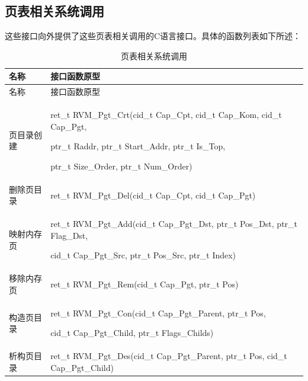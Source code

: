 \newpage
\subsection{页表相关系统调用}\label{subsec:3-5-3}

这些接口向外提供了这些页表相关调用的C语言接口。具体的函数列表如下所述：

\begin{xltabular}{\textwidth}{@{}>{\hsize\raggedright\arraybackslash}X>{\hsize\raggedright\arraybackslash}X@{}}
\caption{页表相关系统调用}\label{tab:3-7}\\
\toprule
名称 & 接口函数原型\tabularnewline
\endfirsthead
\toprule
名称 & 接口函数原型\tabularnewline
\midrule
\endhead
\bottomrule
\endlastfoot
页目录创建\strut
 & ret\_\allowbreak{}t RVM\_\allowbreak{}Pgt\_\allowbreak{}Crt(cid\_\allowbreak{}t Cap\_\allowbreak{}Cpt, cid\_\allowbreak{}t Cap\_\allowbreak{}Kom, cid\_\allowbreak{}t Cap\_\allowbreak{}Pgt,

ptr\_\allowbreak{}t Raddr, ptr\_\allowbreak{}t Start\_\allowbreak{}Addr, ptr\_\allowbreak{}t Is\_\allowbreak{}Top,

ptr\_\allowbreak{}t Size\_\allowbreak{}Order, ptr\_\allowbreak{}t Num\_\allowbreak{}Order)\strut
\tabularnewline
删除页目录 & ret\_\allowbreak{}t RVM\_\allowbreak{}Pgt\_\allowbreak{}Del(cid\_\allowbreak{}t Cap\_\allowbreak{}Cpt, cid\_\allowbreak{}t
Cap\_\allowbreak{}Pgt)\tabularnewline
映射内存页\strut
 & ret\_\allowbreak{}t RVM\_\allowbreak{}Pgt\_\allowbreak{}Add(cid\_\allowbreak{}t Cap\_\allowbreak{}Pgt\_\allowbreak{}Dst, ptr\_\allowbreak{}t Pos\_\allowbreak{}Dst, ptr\_\allowbreak{}t
Flag\_\allowbreak{}Dst,

cid\_\allowbreak{}t Cap\_\allowbreak{}Pgt\_\allowbreak{}Src, ptr\_\allowbreak{}t Pos\_\allowbreak{}Src, ptr\_\allowbreak{}t Index)\strut
\tabularnewline
移除内存页 & ret\_\allowbreak{}t RVM\_\allowbreak{}Pgt\_\allowbreak{}Rem(cid\_\allowbreak{}t Cap\_\allowbreak{}Pgt, ptr\_\allowbreak{}t
Pos)\tabularnewline
构造页目录\strut
 & ret\_\allowbreak{}t RVM\_\allowbreak{}Pgt\_\allowbreak{}Con(cid\_\allowbreak{}t Cap\_\allowbreak{}Pgt\_\allowbreak{}Parent, ptr\_\allowbreak{}t Pos,

cid\_\allowbreak{}t Cap\_\allowbreak{}Pgt\_\allowbreak{}Child, ptr\_\allowbreak{}t Flags\_\allowbreak{}Childs)\strut
\tabularnewline
析构页目录 & ret\_\allowbreak{}t RVM\_\allowbreak{}Pgt\_\allowbreak{}Des(cid\_\allowbreak{}t Cap\_\allowbreak{}Pgt\_\allowbreak{}Parent, ptr\_\allowbreak{}t Pos,
cid\_\allowbreak{}t Cap\_\allowbreak{}Pgt\_\allowbreak{}Child)\tabularnewline
\end{xltabular}

